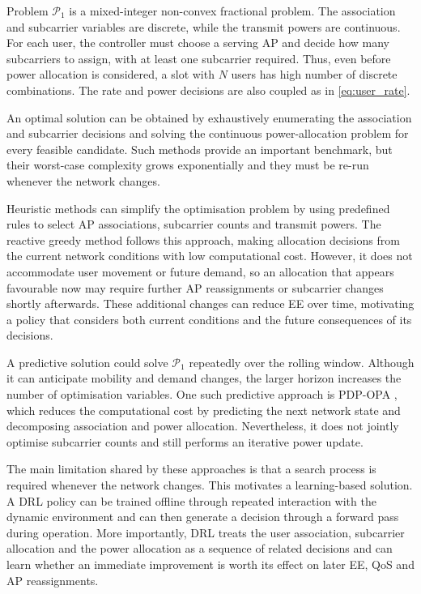 \documentclass[journal]{IEEEtran}
\begin{document}
Problem $\mathcal{P}_{1}$ is a mixed-integer non-convex fractional problem. The association and subcarrier variables are discrete, while the transmit powers are continuous. For each user, the controller must choose a serving AP and decide how many subcarriers to assign, with at least one subcarrier required. Thus, even before power allocation is considered, a slot with $N$ users has high number of discrete combinations. The rate and power decisions are also coupled as in \eqref{eq:user_rate}. %

An optimal solution can be obtained by exhaustively enumerating the association and subcarrier decisions and solving the continuous power-allocation problem for every feasible candidate. Such methods provide an important benchmark, but their worst-case complexity grows exponentially and they must be re-run whenever the network changes.

Heuristic methods can simplify the optimisation problem
by using predefined rules to select AP associations, subcarrier
counts and transmit powers. The reactive greedy \cite{Jiang2021Joint} method follows
this approach, making allocation decisions from the current
network conditions with low computational cost. However, it does
not accommodate user movement or future demand, so an allocation
that appears favourable now may require further AP reassignments
or subcarrier changes shortly afterwards. These additional changes
can reduce EE over time, motivating a policy that considers both
current conditions and the future consequences of its decisions.

A predictive solution could solve $\mathcal{P}_{1}$ repeatedly
over the rolling window. Although it can anticipate mobility and
demand changes, the larger horizon increases the number of
optimisation variables. One such predictive approach is PDP-OPA \cite{Ncube2025Predictive},
which reduces the computational cost by predicting the next network
state and decomposing association and power allocation. Nevertheless, it does not jointly
optimise subcarrier counts and still performs an iterative power update.

The main limitation shared by these approaches is that a search process is required whenever the network changes. This motivates a learning-based solution. A DRL policy can be trained offline through repeated interaction with the dynamic environment and can then generate a decision through a forward pass during operation. More importantly, DRL treats the user association, subcarrier allocation and the power allocation as a sequence of related decisions and can learn whether an immediate improvement is worth its effect on later EE, QoS and AP reassignments.
\end{document}
